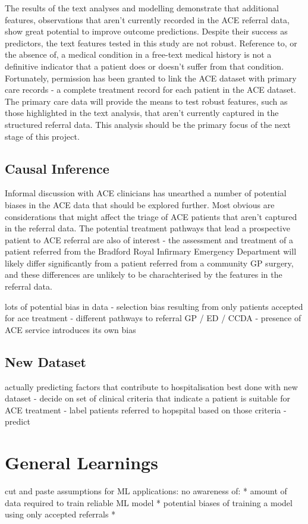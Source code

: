 The results of the text analyses and modelling demonstrate that additional features, observations that aren't currently recorded in the ACE referral data, show great potential to improve outcome predictions. Despite their success as predictors, the text features tested in this study are not robust. Reference to, or the absence of, a medical condition in a free-text medical history is not a definitive indicator that a patient does or doesn't suffer from that condition. Fortunately, permission has been granted to link the ACE dataset with primary care records - a complete treatment record for each patient in the ACE dataset. The primary care data will provide the means to test robust features, such as those highlighted in the text analysis, that aren't currently captured in the structured referral data. This analysis should be the primary focus of the next stage of this project.

\subsection{Causal Inference}

Informal discussion with ACE clinicians has unearthed a number of potential biases in the ACE data that should be explored further. Most obvious are considerations that might affect the triage of ACE patients that aren't captured in the referral data. The potential treatment pathways that lead a prospective patient to ACE referral are also of interest - the assessment and treatment of a patient referred from the Bradford Royal Infirmary Emergency Department will likely differ significantly from a patient referred from a community GP surgery, and these differences are unlikely to be charachterised by the features in the referral data.

lots of potential bias in data - selection bias resulting from only patients accepted for ace treatment - different pathways to referral GP / ED / CCDA - presence of ACE service introduces its own bias

\subsection{New Dataset}

actually predicting factors that contribute to hospitalisation best done with new dataset - decide on set of clinical criteria that indicate a patient is suitable for ACE treatment - label patients referred to hopspital based on those criteria - predict

\section{General Learnings}

cut and paste assumptions for ML applications:
no awareness of:
* amount of data required to train reliable ML model
* potential biases of training a model using only accepted referrals
*
